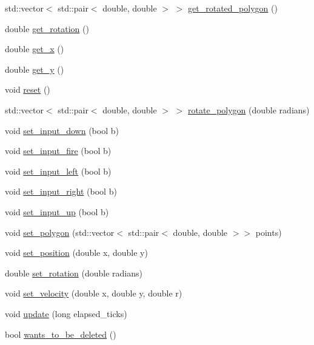 \begin{DoxyCompactItemize}
\item 
std\+::vector$<$ std\+::pair$<$ double, double $>$ $>$ \hyperlink{classAsteroids_1_1Domain_1_1Game_1_1Actors_1_1Actor_a8518140e16304bd6cf7a8bc6a99c9509}{get\+\_\+rotated\+\_\+polygon} ()
\item 
double \hyperlink{classAsteroids_1_1Domain_1_1Game_1_1Actors_1_1Actor_afa2ca9372ddf8f08de11682dae43840f}{get\+\_\+rotation} ()
\item 
double \hyperlink{classAsteroids_1_1Domain_1_1Game_1_1Actors_1_1Actor_a6b56087b412883601fce5af07d67bd50}{get\+\_\+x} ()
\item 
double \hyperlink{classAsteroids_1_1Domain_1_1Game_1_1Actors_1_1Actor_afa54aab6e7be56e04014dd3f80f0e7af}{get\+\_\+y} ()
\item 
void \hyperlink{classAsteroids_1_1Domain_1_1Game_1_1Actors_1_1Actor_a538200753592ca63f7c3348fcece583f}{reset} ()
\item 
std\+::vector$<$ std\+::pair$<$ double, double $>$ $>$ \hyperlink{classAsteroids_1_1Domain_1_1Game_1_1Actors_1_1Actor_a5079dbc947f23a828180242b0ff49f33}{rotate\+\_\+polygon} (double radians)
\item 
void \hyperlink{classAsteroids_1_1Domain_1_1Game_1_1Actors_1_1Actor_a6e0b2bd1eb20d224a527963e5bc035e4}{set\+\_\+input\+\_\+down} (bool b)
\item 
void \hyperlink{classAsteroids_1_1Domain_1_1Game_1_1Actors_1_1Actor_ade49ee1d618ef27e07314794fcf25cf0}{set\+\_\+input\+\_\+fire} (bool b)
\item 
void \hyperlink{classAsteroids_1_1Domain_1_1Game_1_1Actors_1_1Actor_aada120155b2f6b72c6af18296fd97bc7}{set\+\_\+input\+\_\+left} (bool b)
\item 
void \hyperlink{classAsteroids_1_1Domain_1_1Game_1_1Actors_1_1Actor_a6d6074e20ae4461eec4f46226d86ffa2}{set\+\_\+input\+\_\+right} (bool b)
\item 
void \hyperlink{classAsteroids_1_1Domain_1_1Game_1_1Actors_1_1Actor_ad633a650d229eee0e3b35f1495d35473}{set\+\_\+input\+\_\+up} (bool b)
\item 
void \hyperlink{classAsteroids_1_1Domain_1_1Game_1_1Actors_1_1Actor_a224abd0a9dff102361ce2a305ba4734f}{set\+\_\+polygon} (std\+::vector$<$ std\+::pair$<$ double, double $>$$>$ points)
\item 
void \hyperlink{classAsteroids_1_1Domain_1_1Game_1_1Actors_1_1Actor_aa572cc87c0d07330348c811d778aa314}{set\+\_\+position} (double x, double y)
\item 
double \hyperlink{classAsteroids_1_1Domain_1_1Game_1_1Actors_1_1Actor_ad2687b72e2b05bebd6eb419f48d8ebba}{set\+\_\+rotation} (double radians)
\item 
void \hyperlink{classAsteroids_1_1Domain_1_1Game_1_1Actors_1_1Actor_a21d68a9765d6bb40c2e5e083fcd57df6}{set\+\_\+velocity} (double x, double y, double r)
\item 
void \hyperlink{classAsteroids_1_1Domain_1_1Game_1_1Actors_1_1Actor_a5a53ac407eec2feb06f167d1a496bbe5}{update} (long elapsed\+\_\+ticks)
\item 
bool \hyperlink{classAsteroids_1_1Domain_1_1Game_1_1Actors_1_1Actor_a3a07885ee6c81cea6b94b691d7d538c9}{wants\+\_\+to\+\_\+be\+\_\+deleted} ()
\end{DoxyCompactItemize}
